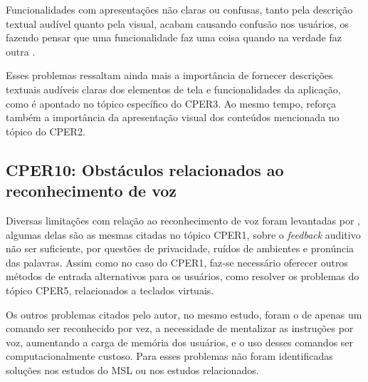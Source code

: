 Funcionalidades com apresentações não claras ou confusas, tanto pela descrição textual audível quanto pela visual, acabam
causando confusão nos usuários, os fazendo pensar que uma funcionalidade faz uma coisa quando na verdade faz outra \cite{Christoph2020}.

Esses problemas ressaltam ainda mais a importância de fornecer descrições textuais audíveis claras dos elementos de tela
e funcionalidades da aplicação, como é apontado no tópico específico do CPER3. Ao mesmo tempo, reforça também a importância
da apresentação visual dos conteúdos mencionada no tópico do CPER2.

\subsection{CPER10: Obstáculos relacionados ao reconhecimento de voz}

Diversas limitações com relação ao reconhecimento de voz foram levantadas por , algumas delas
são as mesmas citadas no tópico CPER1, sobre o \emph{feedback} auditivo não ser suficiente, por questões de privacidade,
ruídos de ambientes e pronúncia das palavras. Assim como no caso do CPER1, faz-se necessário oferecer outros métodos
de entrada alternativos para os usuários, como resolver os problemas do tópico CPER5, relacionados a teclados virtuais.

Os outros problemas citados pelo autor, no mesmo estudo, foram o de apenas um comando ser reconhecido por vez, a necessidade
de mentalizar as instruções por voz, aumentando a carga de memória dos usuários, e o uso desses comandos ser computacionalmente
custoso. Para esses problemas não foram identificadas soluções nos estudos do MSL ou nos estudos relacionados.

